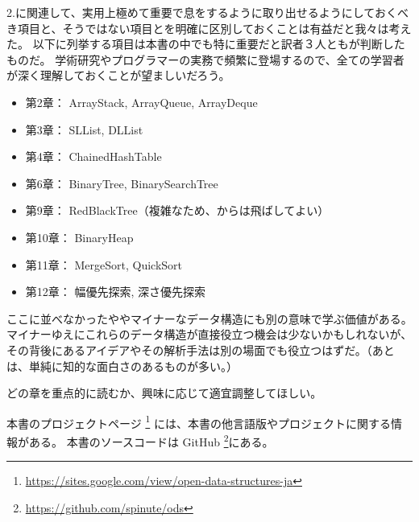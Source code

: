 2.に関連して、実用上極めて重要で息をするように取り出せるようにしておくべき項目と、そうではない項目とを明確に区別しておくことは有益だと我々は考えた。
以下に列挙する項目は本書の中でも特に重要だと訳者３人ともが判断したものだ。
学術研究やプログラマーの実務で頻繁に登場するので、全ての学習者が深く理解しておくことが望ましいだろう。

\begin{itemize}
  \item 第2章： ArrayStack, ArrayQueue, ArrayDeque
  \item 第3章： SLList, DLList
  \item 第4章： ChainedHashTable
  \item 第6章： BinaryTree, BinarySearchTree
  \item 第9章： RedBlackTree（複雑なため、からは飛ばしてよい）
  \item 第10章： BinaryHeap
  \item 第11章： MergeSort, QuickSort
  \item 第12章： 幅優先探索, 深さ優先探索
\end{itemize}

ここに並べなかったややマイナーなデータ構造にも別の意味で学ぶ価値がある。
マイナーゆえにこれらのデータ構造が直接役立つ機会は少ないかもしれないが、その背後にあるアイデアやその解析手法は別の場面でも役立つはずだ。（あとは、単純に知的な面白さのあるものが多い。）

どの章を重点的に読むか、興味に応じて適宜調整してほしい。

本書のプロジェクトページ \footnote {\url{https://sites.google.com/view/open-data-structures-ja}} には、本書の他言語版やプロジェクトに関する情報がある。
本書のソースコードは GitHub \footnote {\url{https://github.com/spinute/ods}}にある。


